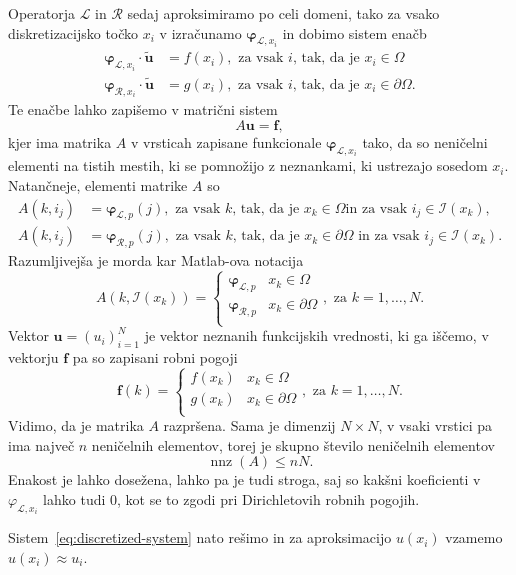 \documentclass[12pt,a4paper,twoside]{article}
\theoremstyle{definition} %
\theoremstyle{plain} %
\numberwithin{equation}{section}
\newcommand{\Rc}{\mathcal{R}}
\newcommand{\I}{\mathcal{I}}
\renewcommand{\L}{\mathcal{L}}
\renewcommand{\b}{\boldsymbol}
\renewcommand{\phi}{\varphi}
\DeclareMathOperator{\nnz}{nnz}
\begin{document}
Operatorja $\L$ in $\Rc$ sedaj aproksimiramo po celi domeni, tako za vsako diskretizacijsko točko
$x_i$ v izračunamo $\b\phi_{\L,x_i}$ in dobimo sistem enačb
\begin{align*}
  \b\phi_{\L,x_i} \cdot \b{\tilde{u}} &= f(x_i), \text{ za vsak $i$, tak, da je $x_i \in \Omega$ } \\
  \b\phi_{\Rc,x_i} \cdot \b{\tilde{u}} &= g(x_i), \text{ za vsak $i$, tak, da je $x_i \in \partial\Omega$.}
\end{align*}
Te enačbe lahko zapišemo v matrični sistem
\begin{equation}
  A\b{u} = \b{f},
  \label{eq:discretized-system}
\end{equation}
kjer ima matrika $A$ v vrsticah zapisane funkcionale $\b\phi_{\L,x_i}$ tako, da so
neničelni elementi na tistih mestih, ki se pomnožijo z neznankami, ki ustrezajo
sosedom $x_i$. Natančneje, elementi matrike $A$ so
\begin{align*}
  A(k, i_j) &= \b\phi_{\L,p}(j), \text{ za vsak $k$, tak, da je $x_k \in \Omega$
  in za vsak $i_j \in \I(x_k)$,} \\
  A(k, i_j) &= \b\phi_{\Rc,p}(j), \text{ za vsak $k$, tak, da je $x_k \in
  \partial\Omega$ in za vsak $i_j \in \I(x_k)$.}
\end{align*}
Razumljivejša je morda kar Matlab-ova notacija
\[
A(k, \I(x_k)) = \begin{cases}
    \b\phi_{\L, p} & x_k \in \Omega \\
    \b\phi_{\Rc, p} & x_k \in \partial\Omega \\
  \end{cases}, \text{ za $k = 1, \ldots, N$}.
\]
Vektor $\b{u} = (u_i)_{i=1}^N$ je vektor neznanih funkcijskih vrednosti, ki ga
iščemo, v vektorju $\b{f}$ pa so zapisani robni pogoji
\[
  \b f(k) = \begin{cases}
    f(x_k) & x_k \in \Omega \\
    g(x_k) & x_k \in \partial\Omega \\
  \end{cases}, \text{ za $k = 1, \ldots, N$}.
\]
Vidimo, da je matrika $A$ razpršena. Sama je dimenzij $N\times N$,
v vsaki vrstici pa ima največ $n$ neničelnih
elementov, torej je skupno število neničelnih elementov
\[
  \nnz(A) \leq nN.
\]
Enakost je lahko dosežena, lahko pa je tudi stroga, saj so kakšni koeficienti v $\phi_{\L,x_i}$ lahko
tudi 0, kot se to zgodi pri Dirichletovih robnih pogojih.

Sistem~\eqref{eq:discretized-system} nato rešimo in za aproksimacijo $u(x_i)$
vzamemo $u(x_i) \approx u_i$.
\end{document}
